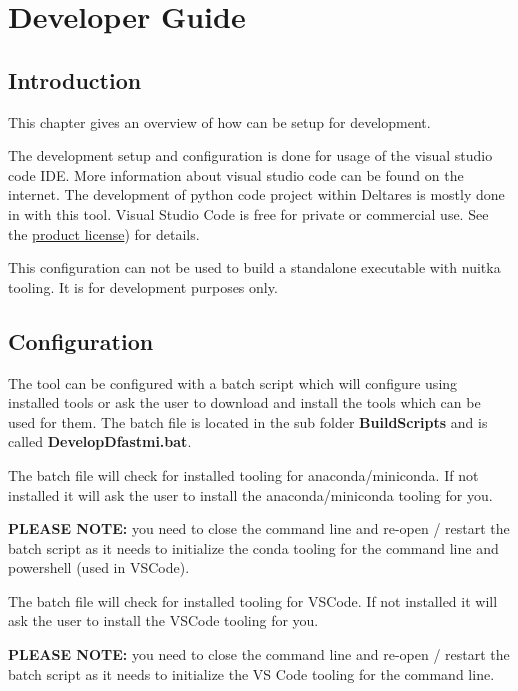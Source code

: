 \chapter{Developer Guide}

\section{Introduction}

This chapter gives an overview of how \dfastmi can be setup for development.

The development setup and configuration is done for usage of the visual studio code IDE. More information about visual studio code can be found on the internet.
The development of python code project within Deltares is mostly done in with this tool. Visual Studio Code is free for private or commercial use. See the \href{https://code.visualstudio.com/license}{product license}) for details.

\begin{Remark}
	\item This configuration can not be used to build a standalone executable with nuitka tooling. It is for development purposes only.
\end{Remark}

\section{Configuration}
The tool can be configured with a batch script which will configure using installed tools or ask the user to download and install the tools which can be used for them. The batch file is located in the sub folder \textbf{BuildScripts} and is called \textbf{DevelopDfastmi.bat}.

The batch file will check for installed tooling for anaconda/miniconda. If not installed it will ask the user to install the anaconda/miniconda tooling for you. 
\begin{Remark}
	\item \textbf{PLEASE NOTE:} you need to close the command line and re-open / restart the batch script as it needs to initialize the conda tooling for the command line and powershell (used in VSCode).
\end{Remark}

The batch file will check for installed tooling for VSCode. If not installed it will ask the user to install the VSCode tooling for you. 

\begin{Remark}
	\item \textbf{PLEASE NOTE:} you need to close the command line and re-open / restart the batch script as it needs to initialize the VS Code tooling for the command line.
\end{Remark}


